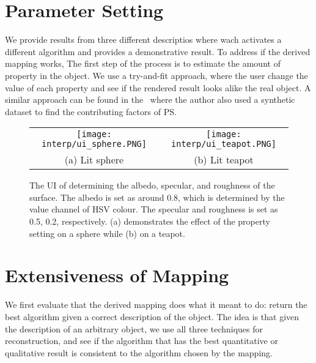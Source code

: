 
\section{Parameter Setting}
We provide results from three different descriptios where wach activates a different algorithm and provides a demonstrative result.
To address if the derived mapping works, The first step of the process is to estimate the amount of property in the object. We use a try-and-fit approach, where the user change the value of each property and see if the rendered result looks alike the real object. A similar approach can be found in the~\cite{Berkiten:2016:ARB} where the author also used a synthetic dataset to find the contributing factors of PS.
\begin{figure}[!htbp]
\centering
\begin{tabular}{cc}
  \texttt{[image: interp/ui\_sphere.PNG]}&
  \texttt{[image: interp/ui\_teapot.PNG]}\\
  (a) Lit sphere & (b) Lit teapot\\
\end{tabular}
\caption{The UI of determining the albedo, specular, and roughness of the surface. The albedo is set as around 0.8, which is determined by the value channel of HSV colour. The specular and roughness is set as 0.5, 0.2, respectively. (a) demonstrates the effect of the property setting on a sphere while (b) on a teapot.}
\label{fig:ui}
\end{figure}

\section{Extensiveness of Mapping}
\label{sec:interp_extend}
We first evaluate that the derived mapping does what it meant to do: return the best algorithm given a correct description of the object. The idea is that given the description of an arbitrary object, we use all three techniques for reconstruction, and see if the algorithm that has the best quantitative or qualitative result is consistent to the algorithm chosen by the mapping.

